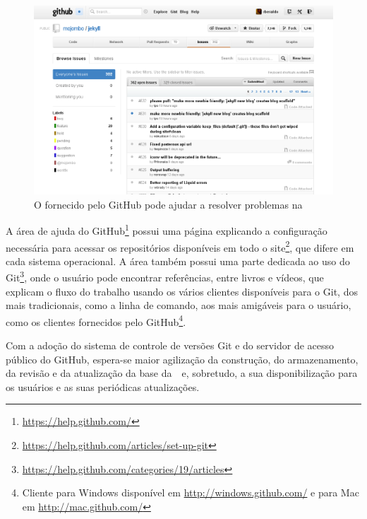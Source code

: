  \begin{figure}[h]
   \centering
   \includegraphics[width=.9\textwidth]{img/bugtracker.png}
   \caption{O  fornecido pelo GitHub pode ajudar a resolver problemas na \wnbr}
   \label{github:bugtracker}
 \end{figure}

A área de ajuda do GitHub\footnote{\url{https://help.github.com/}} possui uma
página explicando a configuração necessária para acessar os repositórios
disponíveis em todo o
site\footnote{\url{https://help.github.com/articles/set-up-git}}, que difere em
cada sistema operacional. A área também possui uma parte dedicada ao uso do
Git\footnote{\url{https://help.github.com/categories/19/articles}}, onde o
usuário pode encontrar referências, entre livros e vídeos, que explicam o fluxo
do trabalho usando os vários clientes disponíveis para o Git, dos mais
tradicionais, como a linha de comando, aos mais amigáveis para o usuário, como
os clientes fornecidos pelo GitHub\footnote{Cliente para Windows disponível em
\url{http://windows.github.com/} e para Mac em \url{http://mac.github.com/}}.

Com a adoção do sistema de controle de versões Git e do servidor de acesso
público do GitHub, espera-se maior agilização da construção, do armazenamento,
da revisão e da atualização da base da~\wnbr\ e, sobretudo, a sua
disponibilização para os usuários e as suas periódicas atualizações.
